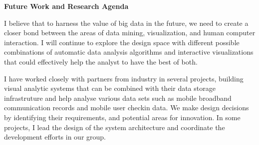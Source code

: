 \documentclass[11pt,a4paper,sans]{moderncv} %
\begin{document}
\textbf{Future Work and Research Agenda}


I believe that to harness the value of big data in the future, we need to create a closer bond between the areas of data mining, visualization, and human computer interaction. I will continue to explore the design space with different possible combinations of automatic data analysis algorithms and interactive visualizations that could effectively help the analyst to have the best of both.



I have worked closely with partners from industry in several projects, building visual analytic systems that can be combined with their data storage infrastruture and help analyse various data sets such as mobile broadband communication records and mobile user checkin data. We make design decisions by identifying their requirements, and potential areas for innovation. In some projects, I lead the design of the system architecture and coordinate the development efforts in our group.



\end{document}
